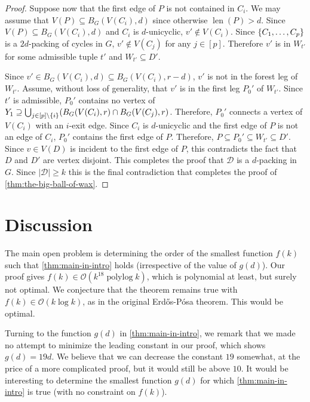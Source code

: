 \documentclass{patmorin}
\newcommand{\pat}[1]{\textcolor{Blue}{[Pat: #1]}}
\DeclareMathOperator{\len}{len}
\DeclareMathOperator{\polylog}{polylog}
\newcommand{\Oh}{\mathcal{O}}
\DeclarePairedDelimiter\set{\{}{\}}
\begin{document}
\begin{proof}
Suppose now that the first edge of $P$ is not contained in $C_i$.  We may assume that $V(P)\subseteq B_G(V(C_i),d)$ since otherwise $\len(P)>d$.  Since $V(P)\subseteq B_G(V(C_i),d)$ and $C_i$ is $d$-unicyclic, $v'\not\in V(C_i)$.  Since $\set{C_1,\ldots,C_p}$
is a $2d$-packing of cycles in $G$, $v'\not\in V(C_j)$ for any $j\in[p]$. Therefore $v'$ is in $W_{t'}$ for some admissible tuple $t'$ and $W_{t'}\subseteq D'$.

Since $v'\in B_G(V(C_i),d)\subseteq B_G(V(C_i),r-d)$, $v'$ is not in the forest leg of $W_{t'}$.
Assume, without loss of generality, that $v'$ is in the first leg $P_0'$ of $W_{t'}$.
Since $t'$ is admissible, $P_0'$ contains no vertex of $Y_1\supseteq \bigcup_{j\in[p]\setminus \set{i}} (B_G(V(C_i),r)\cap B_G(V(C_j),r)$.
Therefore, $P_0'$ connects a vertex of $V(C_i)$ with an $i$-exit edge.
Since $C_i$ is $d$-unicyclic and the first edge of $P$ is not an edge of $C_i$, $P_0'$ contains the first edge of $P$. Therefore, $P\subseteq P_0'\subseteq W_{t'}\subseteq D'$.  Since $v\in V(D)$ is incident to the first edge of $P$, this contradicts the fact that $D$ and $D'$ are vertex disjoint.
This completes the proof that $\mathcal{D}$ is a $d$-packing in $G$. Since $|\mathcal{D}|\geq k$ this is the final contradiction that completes the proof of \cref{thm:the-big-ball-of-wax}.
\end{proof}


\section{Discussion}

The main open problem is determining the order of the smallest function $f(k)$ such that \cref{thm:main-in-intro} holds (irrespective of the value of $g(d)$).
Our proof gives $f(k)\in\Oh(k^{18}\polylog k)$, which is polynomial at least, but surely not optimal.
We conjecture that the theorem remains true with $f(k)\in\Oh(k \log k)$, as in the original Erd\H{o}s-P\'osa theorem.
This would be optimal.

Turning to the function $g(d)$ in  \cref{thm:main-in-intro}, we remark that we made no attempt to minimize the leading constant in our proof, which shows $g(d)=19d$.
We believe that we can decrease the constant $19$ somewhat, at the price of a more complicated proof, but it would still be above $10$.
It would be interesting to determine the smallest function $g(d)$ for which \cref{thm:main-in-intro} is true (with no constraint on $f(k)$).
\end{document}
